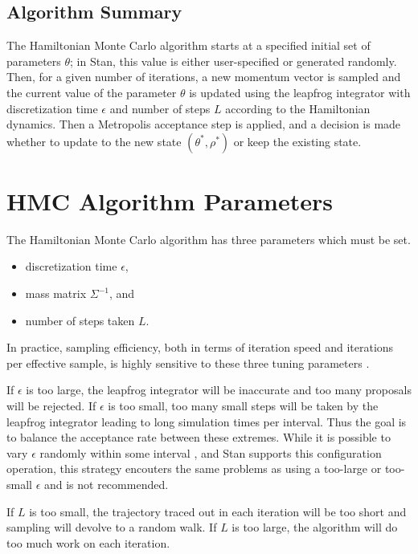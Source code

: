 \subsection{Algorithm Summary}

The Hamiltonian Monte Carlo algorithm starts at a specified initial
set of parameters $\theta$; in Stan, this value is either
user-specified or generated randomly. Then, for a given number of
iterations, a new momentum vector is sampled and the current value of
the parameter $\theta$ is updated using the leapfrog integrator with
discretization time $\epsilon$ and number of steps $L$ according to
the Hamiltonian dynamics. Then a Metropolis acceptance step is
applied, and a decision is made whether to update to the new state
$(\theta^{*},\rho^{*})$ or keep the existing state.


\section{HMC Algorithm Parameters}

The Hamiltonian Monte Carlo algorithm has three parameters which must
be set. 
%
\begin{itemize}
\item discretization time $\epsilon$, 
\item mass matrix $\Sigma^{-1}$, and
\item number of steps taken $L$.
\end{itemize}
%
In practice, sampling efficiency, both in terms of iteration speed and
iterations per effective sample, is highly sensitive to these three
tuning parameters \citep{Neal:2011,Hoffman-Gelman:2014}.

If $\epsilon$ is too large, the leapfrog integrator will be inaccurate
and too many proposals will be rejected. If $\epsilon$ is too small,
too many small steps will be taken by the leapfrog integrator leading
to long simulation times per interval. Thus the goal is to balance the
acceptance rate between these extremes. While it is possible to vary
$\epsilon$ randomly within some interval \citep{Neal:2011}, and Stan
supports this configuration operation, this strategy encouters the
same problems as using a too-large or too-small $\epsilon$ and is not
recommended.

If $L$ is too small, the trajectory traced out in each iteration will
be too short and sampling will devolve to a random walk.  If $L$ is
too large, the algorithm will do too much work on each iteration.

